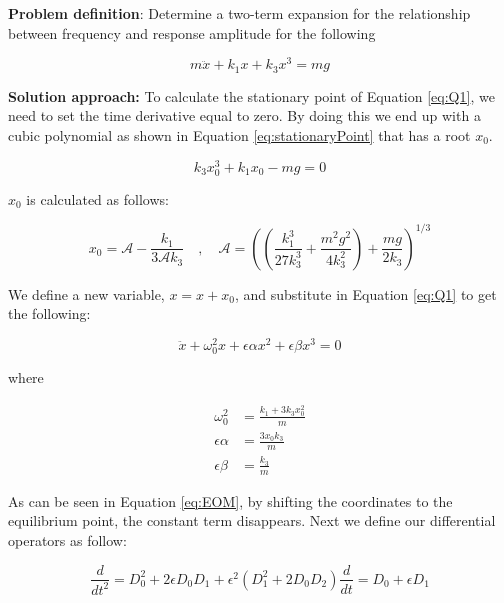 \textbf{Problem definition}:
Determine a two-term expansion for the relationship between frequency and response amplitude for the following

%
\begin{equation}\label{eq:Q1}
	m \ddot{x} + k_1 x + k_3 x^3 = mg
\end{equation}
%

\noindent\hrulefill

\textbf{Solution approach:}
To calculate the stationary point of Equation \eqref{eq:Q1}, we need to set the time derivative equal to zero. By doing this we end up with a cubic polynomial as shown in Equation \eqref{eq:stationaryPoint} that has a root $x_0$.

\begin{equation}\label{eq:stationaryPoint}
	k_3 x_0^3 + k_1 x_0 - mg = 0
\end{equation}

$x_0$ is calculated as follows:

%
\begin{equation}
	x_0 = \mathcal{A} - \frac{k_1}{3 \mathcal{A} k_3} \quad , \quad 
	\mathcal{A} =
	\left(
	\left(
	\frac{k_1^3}{27 k_3^3} + \frac{m^2 g^2}{4 k_3^2}
	\right)
	+ \frac{m g}{2 k_3}
	\right)^{1/3}
\end{equation}
%

We define a new variable, $x = x + x_0$, and substitute in Equation \eqref{eq:Q1} to get the following:

\begin{equation}\label{eq:EOM}
	\ddot{x} + \omega_0^2 x + \epsilon \alpha x^2 + \epsilon \beta x^3 = 0
\end{equation}

where

\begin{align*}
	\omega_0^2 &= \frac{k_1 + 3 k_3 x_0^2}{m} \\
	\epsilon \alpha &= \frac{3 x_0 k_3}{m} \\
	\epsilon \beta &= \frac{k_3}{m}
\end{align*}

As can be seen in Equation \eqref{eq:EOM}, by shifting the coordinates to the equilibrium point, the constant term disappears. Next we define our differential operators as follow:

%
\begin{subequations}\label{eq:operators}
\begin{equation}
	\frac{d}{dt^2} = D_0^2 + 2 \epsilon D_0 D_1 + \epsilon^2 					\left(D_1^2 + 2 D_0 D_2\right)
\end{equation}
\begin{equation}
	\frac{d}{dt} = D_0 + \epsilon D_1
\end{equation}
\end{subequations}
%


